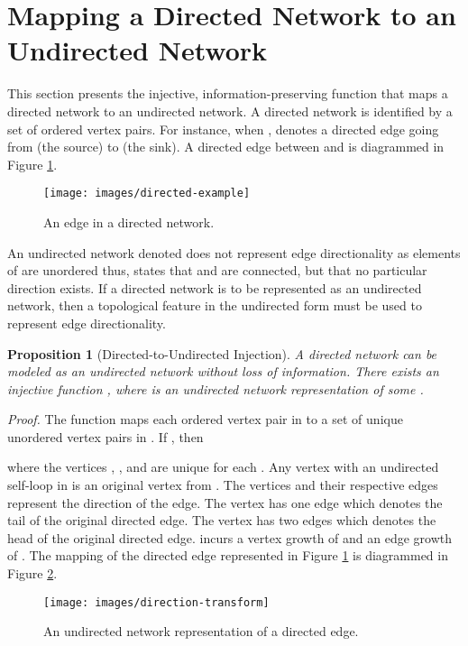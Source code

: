 \documentclass[twocolumn,preprintnumbers,amsmath,amssymb,letter]{revtex4}
\newtheorem{proposition}{Proposition}
\begin{document}
\section{Mapping a Directed Network to an Undirected Network\label{sec:dir-to-und}}

This section presents the injective, information-preserving function  that maps a directed network to an undirected network. A directed network is identified by a set of ordered vertex pairs. For instance, when ,  denotes a directed edge going from  (the source) to  (the sink). A directed edge between  and  is diagrammed in Figure \ref{fig:directed-example}.
\begin{figure}[h!]
	\centering
	\texttt{[image: images/directed-example]}
	 \caption{\label{fig:directed-example}An edge in a directed network.}
\end{figure}

An undirected network denoted  does not represent edge directionality as elements of  are unordered thus,  states that  and  are connected, but that no particular direction exists. If a directed network is to be represented as an undirected network, then a topological feature in the undirected form must be used to represent edge directionality.

\begin{proposition}[Directed-to-Undirected Injection]
A directed network can be modeled as an undirected network without loss of information. There exists an injective function , where  is an undirected network representation of some .
\end{proposition}
\emph{Proof.} The function  maps each ordered vertex pair in  to a set of unique unordered vertex pairs in . If , then

where the vertices , , and  are unique for each . Any vertex with an undirected self-loop in  is an original vertex from . The vertices  and their respective edges represent the direction of the edge. The vertex  has one edge which denotes the tail of the original directed edge. The vertex  has two edges which denotes the head of the original directed edge.  incurs a vertex growth of  and an edge growth of . The  mapping of the directed edge represented in Figure \ref{fig:directed-example} is diagrammed in Figure \ref{fig:direction-transform}.
\begin{figure}[h!]
	\centering
	\texttt{[image: images/direction-transform]}
	 \caption{\label{fig:direction-transform}An undirected network representation of a directed edge.}
\end{figure}
\end{document}
